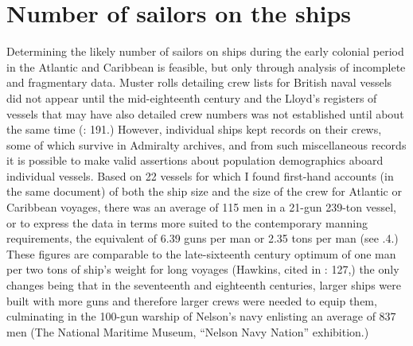 \section{{Number} {of} {sailors} {on} {the} {ships}}%

  Determining the likely number of sailors on ships during the early colonial period in the Atlantic and Caribbean is feasible, but only through analysis of incomplete and fragmentary data. Muster rolls detailing crew lists for British naval vessels did not appear until the mid-eighteenth century \citep[125]{Litter1999} and the Lloyd’s registers of vessels that may have also detailed crew numbers was not established until about the same time (\citealt{Litter1999}: 191.) However, individual ships kept records on their crews, some of which survive in Admiralty archives, and from such miscellaneous records it is possible to make valid assertions about population demographics aboard individual vessels. Based on 22 vessels for which I found first-hand accounts (in the same document) of both the ship size and the size of the crew for Atlantic or Caribbean voyages, there was an average of 115 men in a 21-gun 239-ton vessel, or to express the data in terms more suited to the contemporary manning requirements, the equivalent of 6.39 guns per man or 2.35 tons per man (see .4.) These figures are comparable to the late-sixteenth century optimum of one man per two tons of ship’s weight for long voyages (Hawkins, cited in \citealt{Bicheno2012}: 127,) the only changes being that in the seventeenth and eighteenth centuries, larger ships were built with more guns and therefore larger crews were needed to equip them, culminating in the 100-gun warship of Nelson’s navy enlisting an average of 837 men (The National Maritime Museum, “Nelson Navy Nation” exhibition.)

